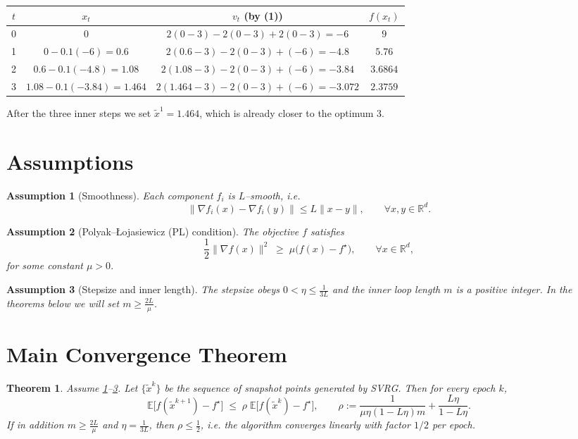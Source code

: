 \documentclass[11pt]{article}
\newtheorem{theorem}{Theorem}[section]
\newtheorem{assumption}{Assumption}[section]
\begin{document}
\begin{center}
\begin{tabular}{c|c|c|c}
$t$ & $x_t$ & $v_t$ (by (1)) & $f(x_t)$ \\ \hline
0 & $0$ & $2(0-3)-2(0-3)+2(0-3)=-6$ & $9$\\
1 & $0-0.1(-6)=0.6$ & $2(0.6-3)-2(0-3)+(-6)=-4.8$ & $5.76$\\
2 & $0.6-0.1(-4.8)=1.08$ & $2(1.08-3)-2(0-3)+(-6)=-3.84$ & $3.6864$\\
3 & $1.08-0.1(-3.84)=1.464$ & $2(1.464-3)-2(0-3)+(-6)=-3.072$ & $2.3759$\\
\end{tabular}
\end{center}
After the three inner steps we set $\tilde{x}^{1}=1.464$, which is already
closer to the optimum $3$.

\section*{Assumptions}
\begin{assumption}[Smoothness]\label{ass:smooth}
Each component $f_i$ is $L$–smooth, i.e.
\[
\|\nabla f_i(x)-\nabla f_i(y)\|\le L\|x-y\|,\qquad\forall x,y\in\mathbb{R}^d.
\]
\end{assumption}
\begin{assumption}[Polyak–Łojasiewicz (PL) condition]\label{ass:pl}
The objective $f$ satisfies
\[
\frac{1}{2}\|\nabla f(x)\|^{2}\;\ge\;\mu\bigl(f(x)-f^{\star}\bigr),
\qquad\forall x\in\mathbb{R}^{d},
\]
for some constant $\mu>0$.
\end{assumption}
\begin{assumption}[Stepsize and inner length]\label{ass:params}
The stepsize obeys $0<\eta\le \frac{1}{3L}$ and the inner loop length $m$ is a
positive integer.  In the theorems below we will set $m\ge \frac{2L}{\mu}$.
\end{assumption}

\section*{Main Convergence Theorem}
\begin{theorem}\label{thm:linear}
Assume \ref{ass:smooth}–\ref{ass:params}.  Let $\{\tilde{x}^{k}\}$ be the
sequence of snapshot points generated by SVRG.  Then for every epoch $k$,
\[
\mathbb{E}\!\bigl[f(\tilde{x}^{k+1})-f^{\star}\bigr]
\;\le\;
\rho\;\mathbb{E}\!\bigl[f(\tilde{x}^{k})-f^{\star}\bigr],
\qquad
\rho:=\frac{1}{\mu\eta(1-L\eta)m}+ \frac{L\eta}{1-L\eta}.
\tag{2}
\]
If in addition $m\ge\frac{2L}{\mu}$ and $\eta=\frac{1}{3L}$, then
$\rho\le\frac{1}{2}$, i.e. the algorithm converges linearly with factor $1/2$
per epoch.
\end{theorem}
\end{document}
